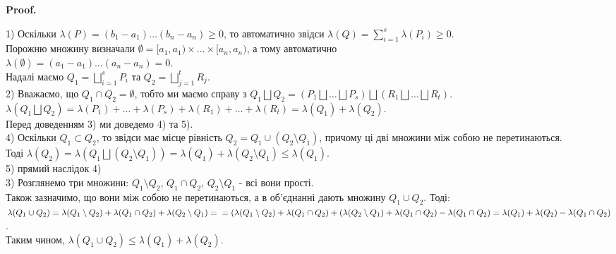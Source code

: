 \documentclass[a4paper, 10pt]{article}
\makeatletter
\def\huge{\displaystyle}
\def\qed{$\blacksquare$}
\theoremstyle{theoremdd}
\theoremstyle{theoremdd}
\theoremstyle{theoremdd}
\theoremstyle{theoremdd}
\theoremstyle{theoremdd}
\theoremstyle{theoremdd}
\theoremstyle{theoremdd}
\theoremstyle{theoremdd}
\renewenvironment{proof}[1][Proof.\\]{\par
\pushQED{\hfill \qed}%
\normalfont \topsep6\p@\@plus6\p@\relax
\trivlist
\item\relax
{\bfseries
#1\@addpunct{.}}\hspace\labelsep\ignorespaces
}{%
\popQED\endtrivlist\@endpefalse
}
\makeatother
\begin{document}
\begin{proof}
1) Оскільки $\lambda(P) = (b_1-a_1)\dots (b_n-a_n) \geq 0$, то автоматично звідси $\lambda(Q) = \huge\sum_{i=1}^s \lambda(P_i) \geq 0$.\\
Порожню множину визначали $\emptyset = [a_1,a_1) \times \dots \times [a_n,a_n)$, а тому автоматично \\ $\lambda (\emptyset) = (a_1-a_1) \dots (a_n-a_n) = 0$.
\bigskip \\
Надалі маємо $Q_1 = \huge\bigsqcup_{i=1}^s P_i$ та $Q_2 = \huge\bigsqcup_{j=1}^t R_j$.\\
2) Вважаємо, що $Q_1 \cap Q_2 = \emptyset$, тобто ми маємо справу з $Q_1 \bigsqcup Q_2 = (P_1 \bigsqcup \dots \bigsqcup P_s) \bigsqcup (R_1 \bigsqcup \dots \bigsqcup R_t)$.\\
$\lambda (Q_1 \bigsqcup Q_2) = \lambda(P_1) + \dots + \lambda(P_s) + \lambda(R_1) + \dots + \lambda(R_t) = \lambda(Q_1) + \lambda(Q_2)$.
\bigskip \\
Перед доведенням 3) ми доведемо 4) та 5).
\bigskip \\
4) Оскільки $Q_1 \subset Q_2$, то звідси має місце рівність $Q_2 = Q_1 \cup (Q_2 \setminus Q_1)$, причому ці дві множини між собою не перетинаються.\\
Тоді $\lambda(Q_2) = \lambda(Q_1 \bigsqcup (Q_2 \setminus Q_1)) = \lambda(Q_1) + \lambda(Q_2 \setminus Q_1) \leq \lambda(Q_1)$.
\bigskip \\
5) прямий наслідок 4)
\bigskip \\
3) Розглянемо три множини: $Q_1 \setminus Q_2$, $Q_1 \cap Q_2$, $Q_2 \setminus Q_1$ - всі вони прості.\\
Також зазначимо, що вони між собою не перетинаються, а в об'єднанні дають множину $Q_1 \cup Q_2$. Тоді:\\
$\lambda(Q_1 \cup Q_2) = \lambda(Q_1 \setminus Q_2) + \lambda (Q_1 \cap Q_2) + \lambda(Q_2 \setminus Q_1) = \\ = (\lambda(Q_1 \setminus Q_2) + \lambda(Q_1\cap Q_2) + (\lambda(Q_2 \setminus Q_1) + \lambda(Q_1 \cap Q_2) - \lambda(Q_1 \cap Q_2) = \lambda(Q_1) + \lambda(Q_2) - \lambda(Q_1 \cap Q_2)$.\\
Таким чином, $\lambda(Q_1 \cup Q_2) \leq \lambda(Q_1) + \lambda(Q_2)$.
\end{proof}
\end{document}
